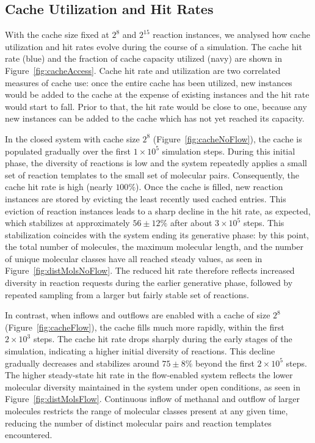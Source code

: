 \subsection{Cache Utilization and Hit Rates}

With the cache size fixed at $2^8$ and $2^{15}$ reaction instances, we analysed how cache utilization and hit rates evolve during the course of a simulation. The cache hit rate (blue) and the fraction of cache capacity utilized (navy) are shown in Figure~\ref{fig:cacheAccess}. Cache hit rate and utilization are two correlated measures of cache use: once the entire cache has been utilized, new instances would be added to the cache at the expense of existing instances and the hit rate would start to fall. Prior to that, the hit rate would be close to one, because any new instances can be added to the cache which has not yet reached its capacity.

In the closed system with cache size $2^8$ (Figure~\ref{fig:cacheNoFlow}), the cache is populated gradually over the first $1\times 10^5$ simulation steps. During this initial phase, the diversity of reactions is low and the system repeatedly applies a small set of reaction templates to the small set of molecular pairs. Consequently, the cache hit rate is high (nearly $100\%$). Once the cache is filled, new reaction instances are stored by evicting the least recently used cached entries. This eviction of reaction instances leads to a sharp decline in the hit rate, as expected, which stabilizes at approximately $56\pm 12\%$ after about $3\times 10^5$ steps.
This stabilization coincides with the system ending its generative phase: by this point, the total number of molecules, the maximum molecular length, and the number of unique molecular classes have all reached steady values, as seen in Figure~\ref{fig:distMolsNoFlow}. The reduced hit rate therefore reflects increased diversity in reaction requests during the earlier generative phase, followed by repeated sampling from a larger but fairly stable set of reactions.

In contrast, when inflows and outflows are enabled with a cache of size $2^8$ (Figure~\ref{fig:cacheFlow}), the cache fills much more rapidly, within the first $2\times 10^3$ steps. The cache hit rate drops sharply during the early stages of the simulation, indicating a higher initial diversity of reactions. This decline gradually decreases and stabilizes around $75\pm 8\%$ beyond the first $2\times 10^5$ steps.
The higher steady-state hit rate in the flow-enabled system reflects the lower molecular diversity maintained in the system under open conditions, as seen in Figure~\ref{fig:distMolsFlow}. Continuous inflow of methanal and outflow of larger molecules restricts the range of molecular classes present at any given time, reducing the number of distinct molecular pairs and reaction templates encountered.

